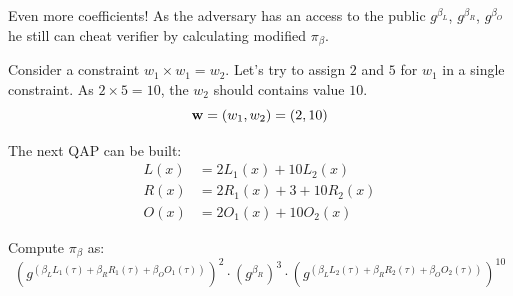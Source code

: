 \documentclass{zkdl-presentation-template}
\begin{document}
    \begin{frame}{Even more coefficients!}
        As the adversary has an access to the public $g^{\beta_L}$, $g^{\beta_R}$, $g^{\beta_O}$ he still can cheat verifier by calculating modified $\pi_{\beta}$.

        \begin{example}
            \small
            Consider a constraint $w_1 \times w_1 = w_2$. Let's try to assign $2$ and $5$ for $w_1$ in a single constraint. As $2 \times 5 = 10$, the $w_2$ should contains value $10$.
            \vspace{-5pt}
            \begin{equation*}
                \mathbf{w} = (w_1, w_2) = (2, 10)
                \vspace{-5pt}
            \end{equation*}
            
            The next QAP can be built:
            \vspace{-5pt}
            \begin{align*}
                L(x) &= 2L_1(x) + 10L_2(x) \\
                R(x) &= 2R_1(x) + 3 + 10R_2(x) \\
                O(x) &= 2O_1(x) + 10O_2(x)
            \end{align*}
            
            Compute $\pi_{\beta}$ as:
            \vspace{-5pt}
            \begin{equation*}
                (g^{\left( \beta_LL_1(\tau) + \beta_RR_1(\tau) + \beta_OO_1(\tau) \right)})^2 \cdot (g^{\beta_R})^3 \cdot (g^{\left( \beta_LL_2(\tau) + \beta_RR_2(\tau) + \beta_OO_2(\tau) \right)})^{10} 
            \end{equation*}
        \end{example}
    \end{frame}
\end{document}
